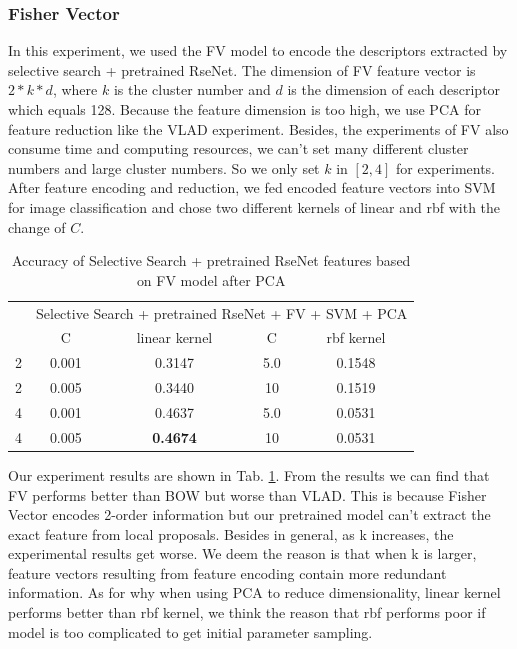 \documentclass[conference]{IEEEtran}
\begin{document}
\subsubsection{Fisher Vector}
\label{sec:FV}
In this experiment, we used the FV model to encode the descriptors extracted by selective search + pretrained RseNet. The dimension of FV feature vector is $2*k*d$, where $k$ is the cluster number and $d$ is the dimension of each descriptor which equals 128. Because the feature dimension is too high, we use PCA for feature reduction like the VLAD experiment. Besides, the experiments of FV also consume time and computing resources, we can't set many different cluster numbers and large cluster numbers. So we only set $k$ in $[2,4]$ for experiments. After feature encoding and reduction, we fed encoded feature vectors into SVM for image classification and chose two different kernels of linear and rbf with the change of $C$.

\begin{table}[htbp]
	\centering
	\newcommand{\tabincell}[2]{\begin{tabular}{@{}#1@{}}#2\end{tabular}}
	\renewcommand\arraystretch{1.0}
	\caption{Accuracy of Selective Search + pretrained RseNet features based on FV model after PCA}
	\label{kbase5}%
	\begin{tabular}{@{}p{1cm}<{\centering}|c|c|c|c}
		\hline
		\multirow{2}{*}{\diagbox[height=2\line,width=1.42cm,font=\tiny]{$k$}{Acc.}{$\mathit{M}$}} &
		\multicolumn{4}{c}{Selective Search + pretrained RseNet + FV + SVM + PCA}\\
		\cline{2-5}
		& {C} & {linear kernel} & {C} & {rbf kernel}\\
		\hline
		2   & 0.001 & 0.3147 & 5.0 & 0.1548\\
        2   & 0.005  & 0.3440 & 10 & 0.1519\\
		\hline
		4   & 0.001  & 0.4637 & 5.0 & 0.0531\\
        4   & 0.005  & \textbf{0.4674} & 10 & 0.0531\\
		\hline
	\end{tabular}
\end{table}

Our experiment results are shown in Tab. \ref{kbase5}. From the results we can find that FV performs better than BOW but worse than VLAD. This is because Fisher Vector encodes 2-order information but our pretrained model can't extract the exact feature from local proposals. Besides in general, as k increases, the experimental results get worse. We deem the reason is that when k is larger, feature vectors resulting from feature encoding contain more redundant information. As for why when using PCA to reduce dimensionality, linear kernel performs better than rbf kernel, we think the reason that rbf performs poor if model is too complicated to get initial parameter sampling.
\end{document}
